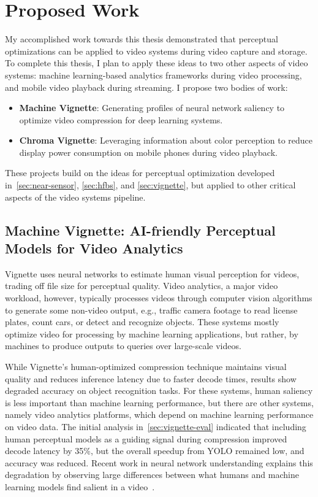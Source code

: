 \section{Proposed Work}
\label{sec:proposed}

My accomplished work towards this thesis demonstrated that perceptual optimizations can be applied to video systems during video capture and storage. 
To complete this thesis, I plan to apply these ideas to two other aspects of video systems: machine learning-based analytics frameworks during video processing, and mobile video playback during streaming.
I propose two bodies of work: 

\begin{itemize}
    \item \textbf{Machine Vignette}: Generating profiles of neural network saliency to optimize video compression for deep learning systems. 
    \item \textbf{Chroma Vignette}: Leveraging information about color perception to reduce display power consumption on mobile phones during video playback.
\end{itemize}

These projects build on the ideas for perceptual optimization developed in~\cref{sec:near-sensor}, \cref{sec:hfbs}, and \cref{sec:vignette}, but applied to other critical aspects of the video systems pipeline.

\subsection{Machine Vignette: AI-friendly Perceptual Models for Video Analytics}
\label{sec:mach-vign}
Vignette uses neural networks to estimate human visual perception for videos, trading off file size for perceptual quality.
Video analytics, a major video workload, however, typically processes videos through computer vision algorithms to generate some non-video output, e.g., traffic camera footage to read license plates, count cars, or detect and recognize objects.
These systems mostly optimize video for processing by machine learning applications, but rather, by machines to produce outputs to queries over large-scale videos.

While Vignette's human-optimized compression technique maintains visual quality and reduces inference latency due to faster decode times, results show degraded accuracy on object recognition tasks.
For these systems, human saliency is less important than machine learning performance, but there are other systems, namely video analytics platforms, which depend on machine learning performance on video data.
The initial analysis in~\cref{sec:vignette-eval} indicated that including human perceptual models as a guiding signal during compression improved decode latency by 35\%, but the overall speedup from YOLO remained low, and accuracy was reduced.
Recent work in neural network understanding explains this degradation by observing large differences between what humans and machine learning models find salient in a video~\cite{olah2018the}.

